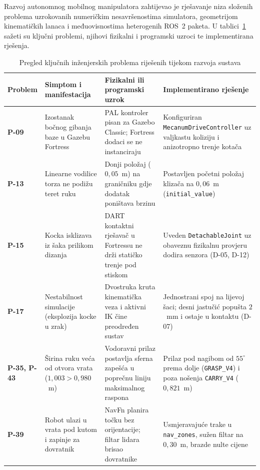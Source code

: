 Razvoj autonomnog mobilnog manipulatora zahtijevao je rješavanje niza složenih problema
uzrokovanih numeričkim nesavršenostima simulatora, geometrijom kinematičkih lanaca i međuovisnostima
heterogenih ROS~2 paketa. U tablici~\ref{tab:problemi} sažeti su ključni problemi, njihovi fizikalni
i programski uzroci te implementirana rješenja.

\begin{table}[H]
  \centering
  \scriptsize
  \caption{Pregled ključnih inženjerskih problema riješenih tijekom razvoja sustava}
  \label{tab:problemi}
  \begin{tabularx}{\textwidth}{@{}>{\bfseries}p{1.4cm}>{\raggedright\arraybackslash}p{3.2cm}>{\raggedright\arraybackslash}X>{\raggedright\arraybackslash}X@{}}
    \toprule
    Problem & Simptom i manifestacija & Fizikalni ili programski uzrok & Implementirano rješenje \\
    \midrule
    P-09 & Izostanak bočnog gibanja baze u Gazebu Fortress & PAL kontroler pisan za Gazebo Classic; Fortress dodaci se ne instanciraju & Konfiguriran \texttt{MecanumDriveController} uz valjkastu koliziju i anizotropno trenje kotača \\
    P-13 & Linearne vodilice torza ne podižu teret ruku & Donji položaj ($0{,}05$~m) na graničniku gdje dodatak poništava brzinu & Postavljen početni položaj klizača na $0{,}06$~m (\texttt{initial\_value}) \\
    P-15 & Kocka isklizava iz šaka prilikom dizanja & DART kontaktni rješavač u Fortressu ne drži statičko trenje pod stiskom & Uveden \texttt{DetachableJoint} uz obaveznu fizikalnu provjeru dodira senzora (D-05, D-12) \\
    P-17 & Nestabilnost simulacije (eksplozija kocke u zrak) & Dvostruka kruta kinematička veza i aktivni IK čine preodređen sustav & Jednostrani spoj na lijevoj šaci; desni jastučić popušta $2$~mm i ostaje u kontaktu (D-07) \\
    P-35, P-43 & Širina ruku veća od otvora vrata ($1{,}003 > 0{,}980$~m) & Vodoravni prilaz postavlja sferna zapešća u poprečnu liniju maksimalnog raspona & Prilaz pod nagibom od $55^\circ$ prema dolje (\texttt{GRASP\_V4}) i poza nošenja \texttt{CARRY\_V4} ($0{,}821$~m) \\
    P-39 & Robot ulazi u vrata pod kutom i zapinje za dovratnik & NavFn planira točku bez orijentacije; filtar lidara brisao dovratnike & Usmjeravajuće trake u \texttt{nav\_zones}, sužen filtar na $0{,}30$~m, brazde nulte cijene \\

\end{tabularx}
\end{table}
